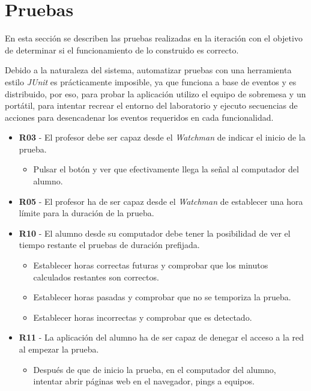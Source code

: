 \section{Pruebas}
\label{sec:iteracion:pruebas}

En esta sección se describen las pruebas realizadas en la iteración con el objetivo de determinar si el funcionamiento de lo construido es correcto.
\newline

Debido a la naturaleza del sistema, automatizar pruebas con una herramienta estilo \emph{JUnit} es prácticamente imposible, ya que funciona a base de eventos y es distribuido, por eso, para probar la aplicación utilizo el equipo de sobremesa y un portátil, para intentar recrear el entorno del laboratorio y ejecuto secuencias de acciones para desencadenar los eventos requeridos en cada funcionalidad.

\begin{itemize}

	\item {\bfseries R03} - El profesor debe ser capaz desde el \emph{Watchman} de indicar el inicio de la prueba.

    \begin{itemize}

        \item Pulsar el botón y ver que efectivamente llega la señal al computador del alumno.

    \end{itemize}

    \item {\bfseries R05} - El profesor ha de ser capaz desde el \emph{Watchman} de establecer una hora límite para la duración de la prueba.

    \item {\bfseries R10} - El alumno desde su computador debe tener la posibilidad de ver el tiempo restante el pruebas de duración prefijada.

    \begin{itemize}
        \item Establecer horas correctas futuras y comprobar que los minutos calculados restantes son correctos.

        \item Establecer horas pasadas y comprobar que no se temporiza la prueba.

        \item Establecer horas incorrectas y comprobar que es detectado.
    \end{itemize}


    \item {\bfseries R11} - La aplicación del alumno ha de ser capaz de denegar el acceso a la red al empezar la prueba.

    \begin{itemize}

        \item Después de que de inicio la prueba, en el computador del alumno, intentar abrir páginas web en el navegador, pings a equipos.
    \end{itemize}

\end{itemize} 